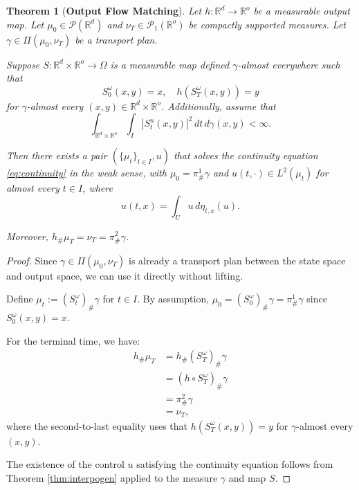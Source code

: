 \documentclass{article}
\newtheorem{theorem}{Theorem}[section]
\begin{document}
\begin{theorem}[\textbf{Output Flow Matching}]
\label{thm:output-flow}
Let $h: \mathbb{R}^d \rightarrow \mathbb{R}^o$ be a measurable output map. Let $\mu_0 \in \mathcal{P}(\mathbb{R}^d)$ and $\nu_T \in \mathcal{P}_1(\mathbb{R}^o)$ be compactly supported measures. Let $\gamma \in \Pi(\mu_0, \nu_T)$ be a transport plan.

Suppose $S: \mathbb{R}^d \times \mathbb{R}^o \rightarrow \Omega$ is a measurable map defined $\gamma$-almost everywhere such that 
\[S^{\omega}_0(x, y) = x, \quad h(S^{\omega}_T(x, y)) = y\]
for $\gamma$-almost every $(x, y) \in \mathbb{R}^d \times \mathbb{R}^o$. Additionally, assume that 
\begin{equation}
\int_{\mathbb{R}^d \times \mathbb{R}^o} \int_{I} |S^u_t(x, y)|^2 \, dt \, d\gamma(x, y) < \infty.
\end{equation}

Then there exists a pair $(\{\mu_t\}_{t \in I}, u)$ that solves the continuity equation \eqref{eq:continuity} in the weak sense, with $\mu_0 = \pi^1_{\#}\gamma$ and $u(t,\cdot) \in L^2(\mu_t)$ for almost every $t \in I$, where
\[u(t,x) = \int_{U} u \, d\eta_{t,x}(u).\]

Moreover, $h_{\#}\mu_T = \nu_T = \pi^2_{\#}\gamma$.
\end{theorem}

\begin{proof}
Since $\gamma \in \Pi(\mu_0, \nu_T)$ is already a transport plan between the state space and output space, we can use it directly without lifting.

Define $\mu_t := (S^\omega_t)_{\#}\gamma$ for $t \in I$. By assumption, $\mu_0 = (S^\omega_0)_{\#}\gamma = \pi^1_{\#}\gamma$ since $S^\omega_0(x,y) = x$.

For the terminal time, we have:
\begin{align}
h_{\#}\mu_T &= h_{\#}(S^\omega_T)_{\#}\gamma \\
&= (h \circ S^\omega_T)_{\#}\gamma \\
&= \pi^2_{\#}\gamma \\
&= \nu_T,
\end{align}
where the second-to-last equality uses that $h(S^\omega_T(x,y)) = y$ for $\gamma$-almost every $(x,y)$.

The existence of the control $u$ satisfying the continuity equation follows from Theorem \ref{thm:interpogen} applied to the measure $\gamma$ and map $S$.
\end{proof}
\end{document}
